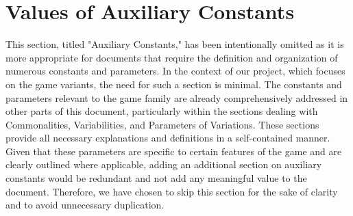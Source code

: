 \section{Values of Auxiliary Constants}

This section, titled "Auxiliary Constants," has been intentionally omitted as it is more appropriate for documents that require the definition and organization of numerous constants and parameters. In the context of our project, which focuses on the game variants, the need for such a section is minimal. The constants and parameters relevant to the game family are already comprehensively addressed in other parts of this document, particularly within the sections dealing with Commonalities, Variabilities, and Parameters of Variations. These sections provide all necessary explanations and definitions in a self-contained manner. Given that these parameters are specific to certain features of the game and are clearly outlined where applicable, adding an additional section on auxiliary constants would be redundant and not add any meaningful value to the document. Therefore, we have chosen to skip this section for the sake of clarity and to avoid unnecessary duplication.



